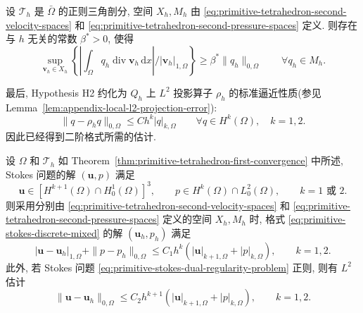 \setcounter{statement}{10}
\begin{Lemma}\label{lem:primitive-tetrahedron-second-global-inf-sup}
设 $\mathcal T_h$ 是 $\bar\Omega$ 的正则三角剖分,
空间 $X_h,M_h$ 由
\eqref{eq:primitive-tetrahedron-second-velocity-spaces} 和
\eqref{eq:primitive-tetrahedron-second-pressure-spaces} 定义.
则存在与 $h$ 无关的常数 $\beta^*>0$, 使得
\[
\sup_{\mathbf v_h\in X_h}
\left\{
\left|\int_\Omega q_h\operatorname{div}\mathbf v_h\,\mathrm dx\right|
/|\mathbf v_h|_{1,\Omega}
\right\}
\geq\beta^*\|q_h\|_{0,\Omega}
\qquad\forall q_h\in M_h.
\]
\end{Lemma}

最后, Hypothesis H2 约化为 $Q_h$ 上 $L^2$ 投影算子 $\rho_h$
的标准逼近性质(参见 Lemma~\ref{lem:appendix-local-l2-projection-error}):
\[
\|q-\rho_hq\|_{0,\Omega}
\leq Ch^k|q|_{k,\Omega}
\qquad\forall q\in H^k(\Omega),
\quad k=1,2.
\]
因此已经得到二阶格式所需的估计.

\setcounter{statement}{4}
\begin{Theorem}\label{thm:primitive-tetrahedron-second-convergence}
设 $\Omega$ 和 $\mathcal T_h$ 如
Theorem~\ref{thm:primitive-tetrahedron-first-convergence} 中所述,
Stokes 问题的解 $(\mathbf u,p)$ 满足
\[
\mathbf u\in[H^{k+1}(\Omega)\cap H_0^1(\Omega)]^3,
\qquad p\in H^k(\Omega)\cap L_0^2(\Omega),
\qquad k=1\text{ 或 }2.
\]
则采用分别由 \eqref{eq:primitive-tetrahedron-second-velocity-spaces} 和
\eqref{eq:primitive-tetrahedron-second-pressure-spaces} 定义的空间
$X_h,M_h$ 时, 格式 \eqref{eq:primitive-stokes-discrete-mixed} 的解
$(\mathbf u_h,p_h)$ 满足
\begin{equation}\label{eq:primitive-tetrahedron-second-h1-error}
|\mathbf u-\mathbf u_h|_{1,\Omega}
+\|p-p_h\|_{0,\Omega}
\leq C_1h^k(|\mathbf u|_{k+1,\Omega}+|p|_{k,\Omega}),
\qquad k=1,2.
\end{equation}
此外, 若 Stokes 问题
\eqref{eq:primitive-stokes-dual-regularity-problem} 正则, 则有
$L^2$ 估计
\begin{equation}\label{eq:primitive-tetrahedron-second-l2-error}
\|\mathbf u-\mathbf u_h\|_{0,\Omega}
\leq C_2h^{k+1}(|\mathbf u|_{k+1,\Omega}+|p|_{k,\Omega}),
\qquad k=1,2.
\end{equation}
\end{Theorem}

